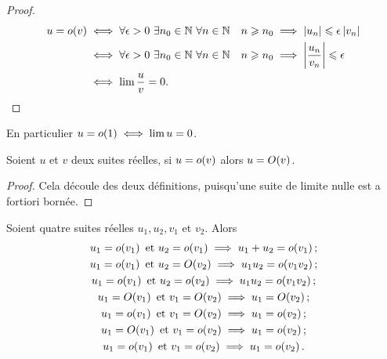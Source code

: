     \begin{proof}
      \begin{align}
        u = \petito{v} & \iff \forall \epsilon > 0 \ \exists n_0 \in \N \ 
        \forall n \in \N \quad n \geqslant n_0 \implies \abs{u_n} \leqslant 
        \epsilon \abs{v_n} \\
                       & \iff \forall \epsilon > 0 \ \exists n_0 \in \N \ 
                       \forall n \in \N \quad n \geqslant n_0 \implies 
                       \abs{\frac{u_n}{v_n}} \leqslant \epsilon \\
                       & \iff \lim \frac{u}{v} =0.
      \end{align}
    \end{proof}
    En particulier \(u = o\mathopen{}\left(1\right) \iff \lim u =0\).
    \begin{prop}
      Soient \(u\) et \(v\) deux suites réelles, si \(u = o\mathopen{}\left(v\right)\) alors \(u 
      = O\mathopen{}\left(v\right)\).
    \end{prop}
    \begin{proof}
      Cela découle des deux définitions, puisqu'une suite de limite nulle est a 
      fortiori bornée.
    \end{proof}
    \begin{prop}
      Soient quatre suites réelles \(u_1, u_2, v_1\) et \(v_2\). Alors
      \begin{gather}
        u_1=o\mathopen{}\left(v_1\right)\text{~et~}u_2 = o\mathopen{}\left(v_1\right)\implies u_1+u_2 = 
        o\mathopen{}\left(v_1\right);\\
        u_1=o\mathopen{}\left(v_1\right)\text{~et~}u_2 = O\mathopen{}\left(v_2\right)\implies u_1u_2 = 
        o\mathopen{}\left(v_1 v_2\right);\\
        u_1=o\mathopen{}\left(v_1\right)\text{~et~}u_2 = o\mathopen{}\left(v_2\right)\implies u_1u_2 = 
        o\mathopen{}\left(v_1 v_2\right);\\
        u_1=O\mathopen{}\left(v_1\right)\text{~et~}v_1 = O\mathopen{}\left(v_2\right)\implies u_1 = 
        O\mathopen{}\left(v_2\right);\\
        u_1=o\mathopen{}\left(v_1\right)\text{~et~}v_1 = O\mathopen{}\left(v_2\right)\implies u_1 = 
        o\mathopen{}\left(v_2\right);\\
        u_1=O\mathopen{}\left(v_1\right)\text{~et~}v_1 = o\mathopen{}\left(v_2\right)\implies u_1 = 
        o\mathopen{}\left(v_2\right);\\
        u_1=o\mathopen{}\left(v_1\right)\text{~et~}v_1 = o\mathopen{}\left(v_2\right)\implies u_1 = 
        o\mathopen{}\left(v_2\right).
      \end{gather}
    \end{prop}
